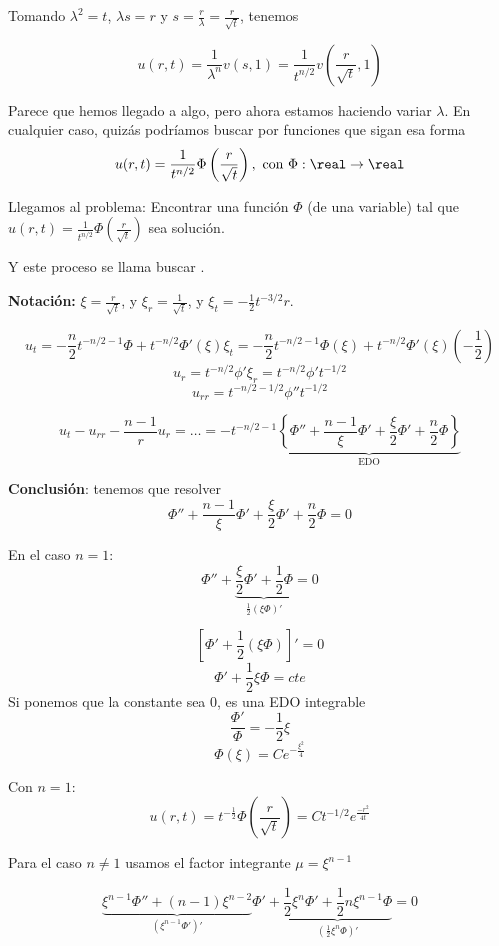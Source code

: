		Tomando $\lambda^2 = t$, $\lambda s = r$ y $s = \frac{r}{\lambda} = \frac{r}{\sqrt{t}}$, tenemos

		\[ u(r,t) = \frac{1}{\lambda^n} v(s,1) = \frac{1}{t^{n/2}} v\left(\frac{r}{\sqrt{t}},1\right)\]

		Parece que hemos llegado a algo, pero ahora estamos haciendo variar $λ$. En cualquier caso, quizás podríamos buscar por funciones que sigan esa forma $$u(r,t) = \frac{1}{t^{n/2}} \Phi\left(\frac{r}{\sqrt{t}}\right), \text{ con }\Phi: \real \rightarrow \real$$

		Llegamos al problema: Encontrar una función $\Phi$ (de una variable) tal que $u(r,t) = \frac{1}{t^{n/2}} \Phi(\frac{r}{\sqrt{t}})$ sea solución.

		Y este proceso se llama buscar .

		\textbf{Notación: } $\xi = \frac{r}{\sqrt{t}}$, y $\xi_r = \frac{1}{\sqrt{t}}$, y $\xi_t = -\frac{1}{2} t^{-3/2} r$.

		\[ u_t = - \frac{n}{2} t^{-n/2-1} \Phi + t^{-n/2} \Phi' (\xi) \xi_t = -\frac{n}{2} t^{-n/2 - 1} \Phi(\xi) + t^{-n/2} \Phi'(\xi) (-\frac{1}{2}) \]
		\[ u_r = t^{-n/2} \phi' \xi_r = t^{-n/2} \phi' t^{-1/2} \]
		\[ u_{rr} = t^{-n/2 - 1/2} \phi'' t^{-1/2} \]

		\[ u_t - u_{rr} - \frac{n-1}{r}u_r = … = - t^{-n/2 - 1} \underbrace{\left\{ \Phi'' + \frac{n-1}{\xi}\Phi' + \frac{\xi}{2}\Phi' + \frac{n}{2}\Phi \right\}}_{\text{EDO}} \]

		{\bf Conclusión}: tenemos que resolver
		\[ \Phi'' + \frac{n-1}{\xi} \Phi'+ \frac{\xi}{2}\Phi' + \frac{n}{2}\Phi = 0\]

		En el caso $n = 1$:
		\[ \Phi'' + \underbrace{\frac{\xi}{2}\Phi' + \frac{1}{2}\Phi}_{\frac{1}{2} (\xi \Phi)'} = 0\]

		\[ \left[ \Phi' + \frac{1}{2} (\xi \Phi)  \right]' = 0\]
		\[ \Phi' + \frac{1}{2} \xi \Phi = cte \]
		Si ponemos que la constante sea 0, es una EDO integrable
		\[ \frac{\Phi'}{\Phi} = -\frac{1}{2} \xi\]
		\[ \Phi(\xi) = C e^{-\frac{\xi^2}{4}}\]

		Con $n=1$:
		\[ u(r,t) = t^{-\frac{1}{2}} \Phi(\frac{r}{\sqrt{t}}) = C t^{-1/2} e^{\frac{-r^2}{4t}}\]

		Para el caso $n \neq 1$ usamos el factor integrante $\mu = \xi^{n-1}$

		\[ \underbrace{\xi^{n-1} \Phi'' + (n-1) \xi^{n-2}}_{(\xi^{n-1}\Phi')'} \Phi' + \underbrace{\frac{1}{2}\xi^n \Phi' + \frac{1}{2} n \xi^{n-1} \Phi}_{(\frac{1}{2} \xi^n \Phi)'} = 0 \]

